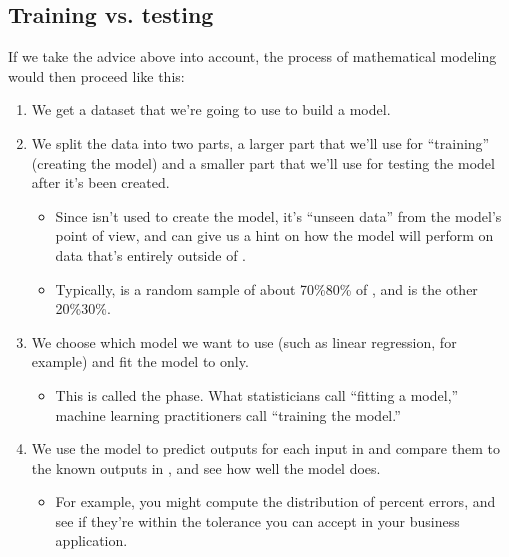 \documentclass[letterpaper,10pt,english]{jupyterBook}
\begin{document}
\subsection{Training vs. testing}
\label{\detokenize{chapter-17-machine-learning:training-vs-testing}}
\sphinxAtStartPar
If we take the advice above into account, the process of mathematical modeling would then proceed like this:
\begin{enumerate}
%
\item {} 
\sphinxAtStartPar
We get a dataset  that we’re going to use to build a model.

\item {} 
\sphinxAtStartPar
We split the data into two parts, a larger part  that we’ll use for “training” (creating the model) and a smaller part  that we’ll use for testing the model after it’s been created.
\begin{itemize}
\item {} 
\sphinxAtStartPar
Since  isn’t used to create the model, it’s “unseen data” from the model’s point of view, and can give us a hint on how the model will perform on data that’s entirely outside of .

\item {} 
\sphinxAtStartPar
Typically,  is a random sample of about 70\%\sphinxhyphen{}80\% of , and  is the other 20\%\sphinxhyphen{}30\%.

\end{itemize}

\item {} 
\sphinxAtStartPar
We choose which model we want to use (such as linear regression, for example) and fit the model to  only.
\begin{itemize}
\item {} 
\sphinxAtStartPar
This is called the  phase.  What statisticians call “fitting a model,” machine learning practitioners call “training the model.”

\end{itemize}

\item {} 
\sphinxAtStartPar
We use the model to predict outputs for each input in  and compare them to the known outputs in , and see how well the model does.
\begin{itemize}
\item {} 
\sphinxAtStartPar
For example, you might compute the distribution of percent errors, and see if they’re within the tolerance you can accept in your business application.


\end{itemize}
\end{enumerate}
\end{document}
